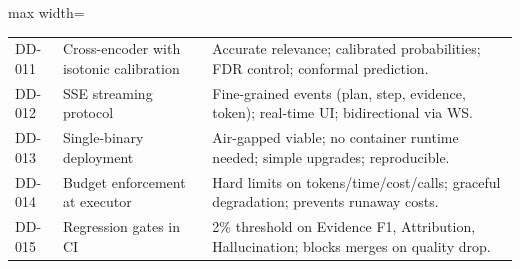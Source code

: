 \begin{table}[htbp]
\begin{adjustbox}{max width=\textwidth}
\begin{tabular}{llp{6cm}}
DD-011 & Cross-encoder with isotonic calibration & Accurate relevance; calibrated probabilities; FDR control; conformal prediction. \\
DD-012 & SSE streaming protocol & Fine-grained events (plan, step, evidence, token); real-time UI; bidirectional via WS. \\
DD-013 & Single-binary deployment & Air-gapped viable; no container runtime needed; simple upgrades; reproducible. \\
DD-014 & Budget enforcement at executor & Hard limits on tokens/time/cost/calls; graceful degradation; prevents runaway costs. \\
DD-015 & Regression gates in CI & 2\% threshold on Evidence F1, Attribution, Hallucination; blocks merges on quality drop. \\
\bottomrule
\end{tabular}
\end{adjustbox}
\end{table}


